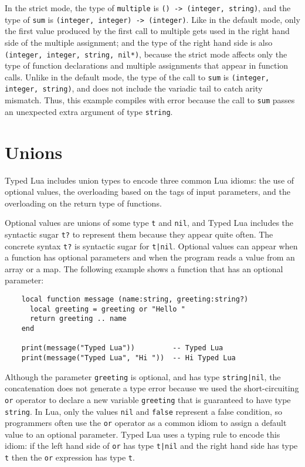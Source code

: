 In the strict mode, the type of \texttt{multiple} is \texttt{() -> (integer, string)},
and the type of \texttt{sum} is \texttt{(integer, integer) -> (integer)}.
Like in the default mode, only the first value produced by the
first call to multiple gets used in the right hand side of the
multiple assignment;
and the type of the right hand side is also
\texttt{(integer, integer, string, nil*)},
because the strict mode affects only the type of function declarations
and multiple assignments that appear in function calls.
Unlike in the default mode, the type of the call to \texttt{sum} is
\texttt{(integer, integer, string)}, and does not include the
variadic tail to catch arity mismatch.
Thus, this example compiles with error because the call to \texttt{sum}
passes an unexpected extra argument of type \texttt{string}.

\section{Unions}
\label{sec:unions}

Typed Lua includes union types to encode three common Lua idioms:
the use of optional values, the overloading based on the tags of
input parameters, and the overloading on the return type of functions.

Optional values are unions of some type \texttt{t} and \texttt{nil},
and Typed Lua includes the syntactic sugar \texttt{t?} to represent
them because they appear quite often.
The concrete syntax \texttt{t?} is syntactic sugar for \texttt{t|nil}.
Optional values can appear when a function has optional parameters
and when the program reads a value from an array or a map.
The following example shows a function that has an optional parameter:
\begin{verbatim}
    local function message (name:string, greeting:string?)
      local greeting = greeting or "Hello "
      return greeting .. name
    end

    print(message("Typed Lua"))         -- Typed Lua
    print(message("Typed Lua", "Hi "))  -- Hi Typed Lua
\end{verbatim}

Although the parameter \texttt{greeting} is optional, and has type
\texttt{string|nil}, the concatenation does not generate a type error
because we used the short-circuiting \texttt{or} operator to declare a
new variable \texttt{greeting} that is guaranteed to have type \texttt{string}. 
In Lua, only the values \texttt{nil} and \texttt{false} represent a
false condition, so programmers often use the \texttt{or} operator as a
common idiom to assign a default value to an optional parameter. 
Typed Lua uses a typing rule to encode this idiom: 
if the left hand side of \texttt{or} has type \texttt{t|nil} and
the right hand side has type \texttt{t} then the \texttt{or} expression has
type \texttt{t}.

